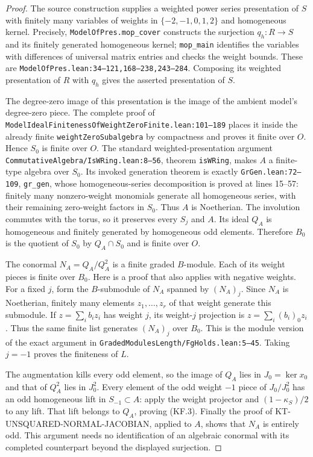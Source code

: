\begin{proof}
The source construction supplies a weighted power series
presentation of $S$ with finitely many variables of
weights in $\{-2,-1,0,1,2\}$ and homogeneous kernel.
Precisely, \texttt{ModelOfPres.mop\_cover} constructs the
surjection $q_h:R\to S$ and its finitely generated
homogeneous kernel; \texttt{mop\_main} identifies the
variables with differences of universal matrix entries
and checks the weight bounds.  These are
\texttt{ModelOfPres.lean:34--121,168--238,243--284}.
Composing its weighted presentation of $R$ with $q_h$
gives the asserted presentation of $S$.

The degree-zero image of this presentation is the image
of the ambient model's degree-zero piece.  The complete
proof of
\texttt{ModelIdealFinitenessOfWeightZeroFinite.lean:101--189}
places it inside the already finite
\texttt{weightZeroSubalgebra} by compactness and proves
it finite over $O$.  Hence $S_0$ is finite over $O$.
The standard weighted-presentation argument
\texttt{CommutativeAlgebra/IsWRing.lean:8--56}, theorem
\texttt{isWRing}, makes $A$ a finite-type algebra over
$S_0$.  Its invoked generation theorem is exactly
\texttt{GrGen.lean:72--109}, \texttt{gr\_gen}, whose
homogeneous-series decomposition is proved at lines
15--57: finitely many
nonzero-weight monomials generate all homogeneous
series, with their remaining zero-weight factors in
$S_0$.  Thus $A$ is Noetherian.  The involution commutes
with the torus, so it preserves every $S_j$ and $A$.
Its ideal $Q_A$ is homogeneous and finitely generated
by homogeneous odd elements.  Therefore $B_0$ is the
quotient of $S_0$ by $Q_A\cap S_0$ and is finite over $O$.

The conormal $N_A=Q_A/Q_A^2$ is a finite graded
$B$-module.  Each of its weight pieces is finite over
$B_0$.  Here is a proof that also applies with negative
weights.  For a fixed $j$, form the $B$-submodule of
$N_A$ spanned by $(N_A)_j$.  Since $N_A$ is Noetherian,
finitely many elements $z_1,\ldots,z_r$ of that weight
generate this submodule.  If
$z=\sum_i b_i z_i$ has weight $j$, its weight-$j$
projection is $z=\sum_i(b_i)_0z_i$.  Thus the same
finite list generates $(N_A)_j$ over $B_0$.  This is
the module version of the exact argument in
\texttt{GradedModulesLength/FgHolds.lean:5--45}.
Taking $j=-1$ proves the finiteness of $L$.

The augmentation kills every odd element, so the image
of $Q_A$ lies in $J_0=\ker x_0$ and that of $Q_A^2$
lies in $J_0^2$.  Every element of the odd weight $-1$
piece of $J_0/J_0^2$ has an odd homogeneous lift in
$S_{-1}\subset A$: apply the weight projector and
$(1-\kappa_S)/2$ to any lift.  That lift belongs to
$Q_A$, proving (KF.3).  Finally the proof of
KT-UNSQUARED-NORMAL-JACOBIAN, applied to $A$, shows
that $N_A$ is entirely odd.  This argument needs no
identification of an algebraic conormal with its
completed counterpart beyond the displayed
surjection.
\end{proof}

